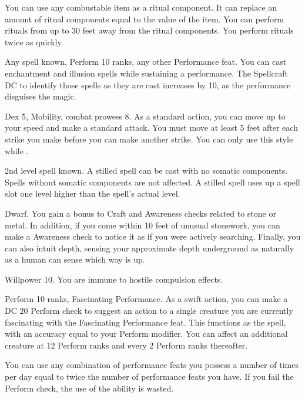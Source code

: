  \x
{}
You can use any combustable item as a ritual component.
It can replace an amount of ritual components equal to the value of the item.
You can perform rituals from up to 30 feet away from the ritual components.
You perform rituals twice as quickly.

\featpres Any spell known, Perform 10 ranks, any other Performance feat.
\featben You can cast enchantment and illusion spells while sustaining a performance.
The Spellcraft DC to identify those spells as they are cast increases by 10, as the performance disguises the magic.

\featpres Dex 5, Mobility, combat prowess 8.
\featben As a standard action, you can move up to your speed and make a standard attack.
You must move at least 5 feet after each strike you make before you can make another strike.
You can only use this style while \unencumbered.

\featpre 2nd level spell known.
\featben A stilled spell can be cast with no somatic components.
Spells without somatic components are not affected.
A stilled spell uses up a spell slot one level higher than the spell's actual level.

\featpre Dwarf.
\featben You gain a  bonus to Craft and Awareness checks related to stone or metal.
In addition, if you come within 10 feet of unusual stonework, you can make a Awareness check to notice it as if you were actively searching.
Finally, you can also intuit depth, sensing your approximate depth underground as naturally as a human can sense which way is up.

\featpre Willpower 10.
\featben You are immune to hostile compulsion effects.

\featpres Perform 10 ranks, Fascinating Performance.
\featben As a swift action, you can make a DC 20 Perform check to suggest an action to a single creature you are currently fascinating with the Fascinating Performance feat.
This functions as the  spell, with an accuracy equal to your Perform modifier.
You can affect an additional creature at 12 Perform ranks and every 2 Perform ranks thereafter.

You can use any combination of performance feats you possess a number of times per day equal to twice the number of performance feats you have.
If you fail the Perform check, the use of the ability is wasted.

